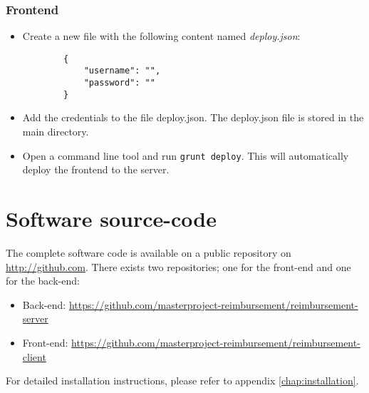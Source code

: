 \subsection{Frontend}

\begin{itemize}

    \item Create a new file with the following content named \textit{deploy.json}:
    \begin{lstlisting}
        {
            "username": "",
            "password": "" 
        }   
    \end{lstlisting}
    \item Add the credentials to the file deploy.json. The deploy.json file is stored in the main directory.
    \item Open a command line tool and run \texttt{grunt deploy}. This will automatically deploy the frontend to the server. 

\end{itemize}

\chapter{Software source-code}

The complete software code is available on a public repository on \url{http://github.com}. There exists two repositories; one for the front-end and one for the back-end:

\begin{itemize}
\item Back-end: \newline \url{https://github.com/masterproject-reimbursement/reimbursement-server}
\item Front-end: \newline \url{https://github.com/masterproject-reimbursement/reimbursement-client}
\end{itemize}

For detailed installation instructions, please refer to appendix \ref{chap:installation}. 
